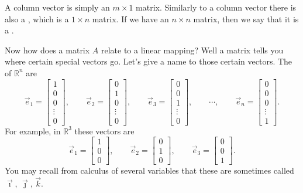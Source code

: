 A column vector is simply an $m \times 1$ matrix.  Similarly to
a column vector there is also a 
\emph{}, which is a $1 \times n$ matrix.
If we have an $n \times n$ matrix, then we say that it is a
\emph{}.

Now how does a matrix $A$ relate to a linear mapping?
Well a matrix tells you where
certain special vectors go.  Let's give a name to those certain vectors.
The \emph{} of ${\mathbb R}^n$ are
\begin{equation*}
\vec{e}_1 =
\begin{bmatrix}
1 \\ 0 \\ 0 \\ \vdots \\ 0
\end{bmatrix} ,
\qquad
\vec{e}_2 =
\begin{bmatrix}
0 \\ 1 \\ 0 \\ \vdots \\ 0
\end{bmatrix} ,
\qquad
\vec{e}_3 =
\begin{bmatrix}
0 \\ 0 \\ 1 \\ \vdots \\ 0
\end{bmatrix} ,
\qquad
\cdots ,
\qquad
\vec{e}_n =
\begin{bmatrix}
0 \\ 0 \\ 0 \\ \vdots \\ 1
\end{bmatrix} .
\end{equation*}
For example, in ${\mathbb R}^3$ these vectors are
\begin{equation*}
\vec{e}_1 =
\begin{bmatrix}
1 \\ 0 \\ 0
\end{bmatrix} ,
\qquad
\vec{e}_2 =
\begin{bmatrix}
0 \\ 1 \\ 0
\end{bmatrix} ,
\qquad
\vec{e}_3 =
\begin{bmatrix}
0 \\ 0 \\ 1
\end{bmatrix} .
\end{equation*}
You may recall from calculus of several variables that these are
sometimes called $\vec{\imath}$, $\vec{\jmath}$, $\vec{k}$.

